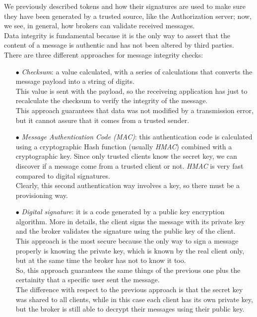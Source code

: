 \documentclass[12pt]{report}
\begin{document}
{{We previously described tokens and how their signatures are used to make sure they have been generated by a trusted source, like the Authorization server; now, we see, in general, how brokers can validate received messages.\\
Data integrity is fundamental because it is the only way to assert that the content of a message is authentic and has not been altered by third parties.\\
There are three different approaches for message integrity checks:

\begin{itemize}
\setlength{\itemindent}{+4mm}
\item[$\bullet$] \emph{Checksum}: a value calculated, with a series of calculations that converts the message payload into a string of digits.\\
This value is sent with the payload, so the receiveing application has just to recalculate the checksum to verify the integrity of the message.\\
This approach guarantees that data was not modified by a transmission error, but it cannot assure that it comes from a trusted sender.

\item[$\bullet$] \emph{Message Authentication Code (MAC)}: this authentication code is calculated using a cryptographic Hash function (usually \emph{HMAC}) combined with a cryptographic key. Since only trusted clients know the secret key, we can discover if a message come from a trusted client or not. \emph{HMAC} is very fast compared to digital signatures.\\
Clearly, this second authentication way involves a key, so there must be a provisioning way.

\item[$\bullet$] \emph{Digital signature}: it is a code generated by a public key encryption algorithm. More in details, the client signs the message with its private key and the broker validates the signature using the public key of the client.\\
This approach is the most secure because the only way to sign a message properly is knowing the private key, which is known by the real client only, but at the same time the broker has not to know it too.\\
So, this approach guarantees the same things of the previous one plus the certainity that a specific user sent the message.\\
The difference with respect to the previous approach is that the secret key was shared to all clients, while in this case each client has its own private key, but the broker is still able to decrypt their messages using their public key.\\
\end{itemize}

}}
\end{document}

